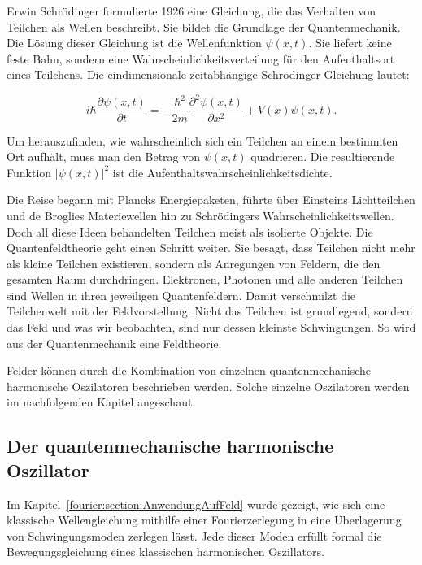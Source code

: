 	
	Erwin Schrödinger formulierte 1926 eine Gleichung, die das Verhalten von Teilchen als Wellen beschreibt. 
	Sie bildet die Grundlage der Quantenmechanik. Die Lösung dieser Gleichung ist die Wellenfunktion $\psi(x, t)$. Sie liefert keine feste Bahn, sondern eine Wahrscheinlichkeitsverteilung für den Aufenthaltsort eines Teilchens.
	Die eindimensionale zeitabhängige Schrödinger-Gleichung lautet:
	
	\begin{equation}\label{fourier:equation:zeitabhaengigeSchroedingerGleichung}
		i \hbar \frac{\partial \psi(x,t)}{\partial t} = -\frac{\hbar^2}{2m} \frac{\partial^2 \psi(x,t)}{\partial x^2} + V(x) \psi(x,t).
	\end{equation}
	
	
	Um herauszufinden, wie wahrscheinlich sich ein Teilchen an einem bestimmten Ort aufhält, muss man den Betrag von $\psi(x, t)$ quadrieren. 
	Die resultierende Funktion $|\psi(x, t)|^2$ ist die Aufenthaltswahrscheinlichkeitsdichte. 
	
	Die Reise begann mit Plancks Energiepaketen, führte über Einsteins Lichtteilchen und de Broglies Materiewellen hin zu Schrödingers Wahrscheinlichkeitswellen. 
	Doch all diese Ideen behandelten Teilchen meist als isolierte Objekte.
	Die Quantenfeldtheorie geht einen Schritt weiter.
	Sie besagt, dass Teilchen nicht mehr als kleine Teilchen existieren, sondern als Anregungen von Feldern, die den gesamten Raum durchdringen. 
	Elektronen, Photonen und alle anderen Teilchen sind Wellen in ihren jeweiligen Quantenfeldern.
	Damit verschmilzt die Teilchenwelt mit der Feldvorstellung.
	Nicht das Teilchen ist grundlegend, sondern das Feld und was wir beobachten, sind nur dessen kleinste Schwingungen.
	So wird aus der Quantenmechanik eine Feldtheorie.
	
	
	Felder können durch die Kombination von einzelnen quantenmechanische harmonische Oszilatoren beschrieben werden. Solche einzelne Oszilatoren werden im nachfolgenden Kapitel angeschaut.
	
	
	\subsection{Der quantenmechanische harmonische Oszillator\label{fourier:subsection:derQMHarmonischeOszillator}}

	Im Kapitel~\ref{fourier:section:AnwendungAufFeld} wurde gezeigt, wie sich eine klassische Wellengleichung mithilfe einer Fourierzerlegung in eine Überlagerung von Schwingungsmoden zerlegen lässt.
	Jede dieser Moden erfüllt formal die Bewegungsgleichung eines klassischen harmonischen Oszillators.

